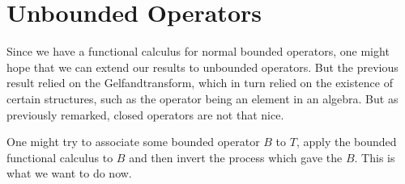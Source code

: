 \section{Unbounded Operators}



Since we have a functional calculus for normal bounded operators, one might hope 
that we can extend our results to unbounded operators. But the previous 
result relied on the Gelfandtransform, which in turn relied on the existence
of certain structures, such as the operator being an element in an algebra. 
But as previously remarked, closed operators are not that nice.

One might 
try to associate some bounded operator $B$ to $T$, apply the bounded functional
calculus to $B$ and then invert the process which gave the $B$.
This is what we want to do now.

